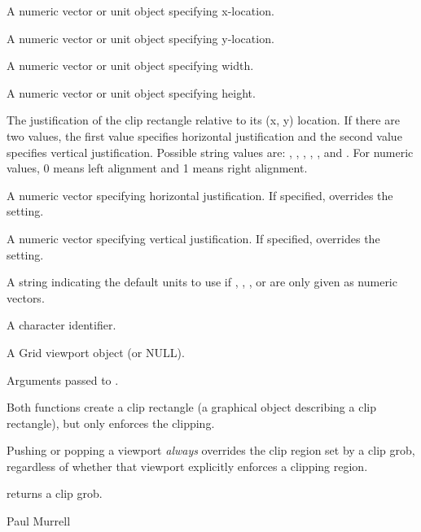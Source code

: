 \begin{Arguments}
\begin{ldescription}
\item[\code{x}] A numeric vector or unit object specifying x-location.
\item[\code{y}] A numeric vector or unit object specifying y-location.
\item[\code{width}] A numeric vector or unit object specifying width.
\item[\code{height}] A numeric vector or unit object specifying height.
\item[\code{just}] The justification of the clip rectangle
relative to its (x, y) location.  If there are two values, the first
value specifies horizontal justification and the second value specifies
vertical justification.  Possible string values are: ,
, , , ,
and .  For numeric values, 0 means left alignment
and 1 means right alignment.

\item[\code{hjust}] A numeric vector specifying horizontal justification.
If specified, overrides the  setting.
\item[\code{vjust}] A numeric vector specifying vertical justification.
If specified, overrides the  setting.
\item[\code{default.units}] A string indicating the default units to use
if , , , or 
are only given as numeric vectors. 
\item[\code{name}]  A character identifier. 
\item[\code{vp}] A Grid viewport object (or NULL).
\item[\code{...}] Arguments passed to .
\end{ldescription}
\end{Arguments}
%
\begin{Details}\relax
Both functions create a clip rectangle (a graphical object describing
a clip rectangle), but only 
enforces the clipping.

Pushing or popping a viewport \emph{always} overrides the clip
region set by a clip grob, regardless of whether that viewport
explicitly enforces a clipping region.
\end{Details}
%
\begin{Value}
 returns a clip grob.  
\end{Value}
%
\begin{Author}\relax
Paul Murrell
\end{Author}
